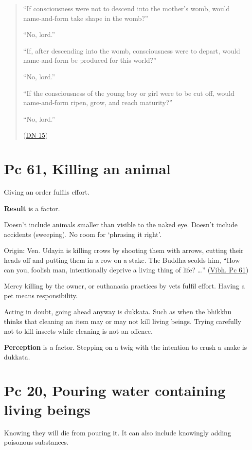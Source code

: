 \begin{quote}
``If consciousness were not to descend into the mother's womb, would
name-and-form take shape in the womb?''

``No, lord.''

``If, after descending into the womb, consciousness were to depart,
would name-and-form be produced for this world?''

``No, lord.''

``If the consciousness of the young boy or girl were to be cut off,
would name-and-form ripen, grow, and reach maturity?''

``No, lord.''

(\href{https://www.accesstoinsight.org/tipitaka/dn/dn.15.0.than.html}{DN
15})
\end{quote}

\section{Pc 61, Killing an animal}

Giving an order fulfils effort.

\textbf{Result} is a factor.

Doesn't include animals smaller than visible to the naked eye. Doesn't
include accidents (sweeping). No room for `phrasing it right'.

Origin: Ven. Udayin is killing crows by shooting them with arrows,
cutting their heads off and putting them in a row on a stake. The Buddha
scolds him, ``How can you, foolish man, intentionally deprive a living
thing of life? \ldots{}''
(\href{https://suttacentral.net/pli-tv-bu-vb-pc61/en/horner}{Vibh. Pc
61})

Mercy killing by the owner, or euthanasia practices by vets fulfil
effort. Having a pet means responsibility.

Acting in doubt, going ahead anyway is dukkata. Such as when the bhikkhu
thinks that cleaning an item may or may not kill living beings. Trying
carefully not to kill insects while cleaning is not an offence.

\textbf{Perception} is a factor. Stepping on a twig with the intention
to crush a snake is dukkata.

\section{Pc 20, Pouring water containing living beings}

Knowing they will die from pouring it. It can also include knowingly
adding poisonous substances.

